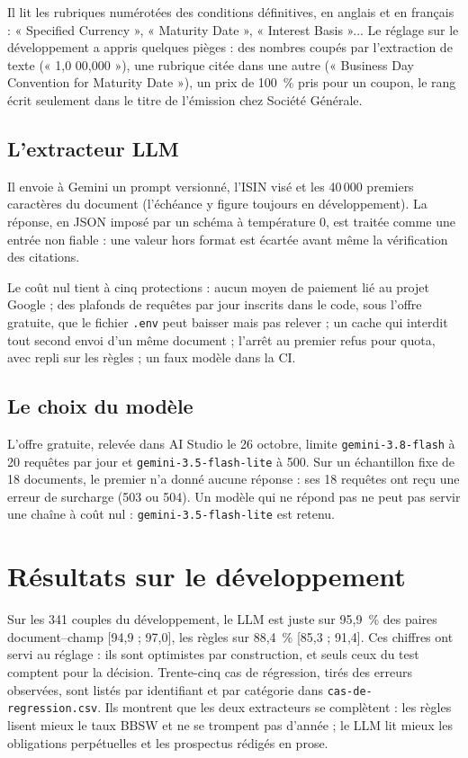 \documentclass[11pt,a4paper]{article}
\begin{document}
Il lit les rubriques numérotées des conditions définitives, en anglais et en français : « Specified Currency », « Maturity Date », « Interest Basis »... Le réglage sur le développement a appris quelques pièges : des nombres coupés par l'extraction de texte (« 1,0 00,000 »), une rubrique citée dans une autre (« Business Day Convention for Maturity Date »), un prix de 100~\% pris pour un coupon, le rang écrit seulement dans le titre de l'émission chez Société Générale.

\subsection{L'extracteur LLM}

Il envoie à Gemini un prompt versionné, l'ISIN visé et les 40\,000 premiers caractères du document (l'échéance y figure toujours en développement). La réponse, en JSON imposé par un schéma à température 0, est traitée comme une entrée non fiable : une valeur hors format est écartée avant même la vérification des citations.

Le coût nul tient à cinq protections : aucun moyen de paiement lié au projet Google ; des plafonds de requêtes par jour inscrits dans le code, sous l'offre gratuite, que le fichier \texttt{.env} peut baisser mais pas relever ; un cache qui interdit tout second envoi d'un même document ; l'arrêt au premier refus pour quota, avec repli sur les règles ; un faux modèle dans la CI.

\subsection{Le choix du modèle}

L'offre gratuite, relevée dans AI Studio le 26 octobre, limite \texttt{gemini-3.8-flash} à 20 requêtes par jour et \texttt{gemini-3.5-flash-lite} à 500. Sur un échantillon fixe de 18 documents, le premier n'a donné aucune réponse : ses 18 requêtes ont reçu une erreur de surcharge (503 ou 504). Un modèle qui ne répond pas ne peut pas servir une chaîne à coût nul : \texttt{gemini-3.5-flash-lite} est retenu.

\section{Résultats sur le développement}

Sur les 341 couples du développement, le LLM est juste sur 95,9~\% des paires document--champ [94,9 ; 97,0], les règles sur 88,4~\% [85,3 ; 91,4]. Ces chiffres ont servi au réglage : ils sont optimistes par construction, et seuls ceux du test comptent pour la décision. Trente-cinq cas de régression, tirés des erreurs observées, sont listés par identifiant et par catégorie dans \texttt{cas-de-regression.csv}. Ils montrent que les deux extracteurs se complètent : les règles lisent mieux le taux BBSW et ne se trompent pas d'année ; le LLM lit mieux les obligations perpétuelles et les prospectus rédigés en prose.
\end{document}
